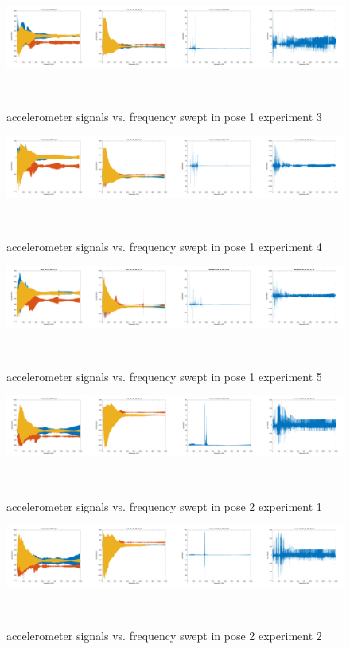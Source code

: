 \documentclass{sigchi}
\begin{document}
\begin{figure}
  \centering
  \includegraphics[width=1.95\columnwidth]{figures/pose1_3}
  \caption{accelerometer signals vs. frequency swept in pose 1 experiment 3}
    ~\label{fig:pose1_3}
\end{figure}

\begin{figure}
  \centering
  \includegraphics[width=1.95\columnwidth]{figures/pose1_4}
  \caption{accelerometer signals vs. frequency swept in pose 1 experiment 4}
    ~\label{fig:pose1_4}
\end{figure}

\begin{figure}
  \centering
  \includegraphics[width=1.95\columnwidth]{figures/pose1_5}
  \caption{accelerometer signals vs. frequency swept in pose 1 experiment 5}
    ~\label{fig:pose1_5}
\end{figure}

\begin{figure}
  \centering
  \includegraphics[width=1.95\columnwidth]{figures/pose2_1}
  \caption{accelerometer signals vs. frequency swept in pose 2 experiment 1}
    ~\label{fig:pose2_1}
\end{figure}

\begin{figure}
  \centering
  \includegraphics[width=1.95\columnwidth]{figures/pose2_2}
  \caption{accelerometer signals vs. frequency swept in pose 2 experiment 2}
    ~\label{fig:pose2_2}
\end{figure}
\end{document}
